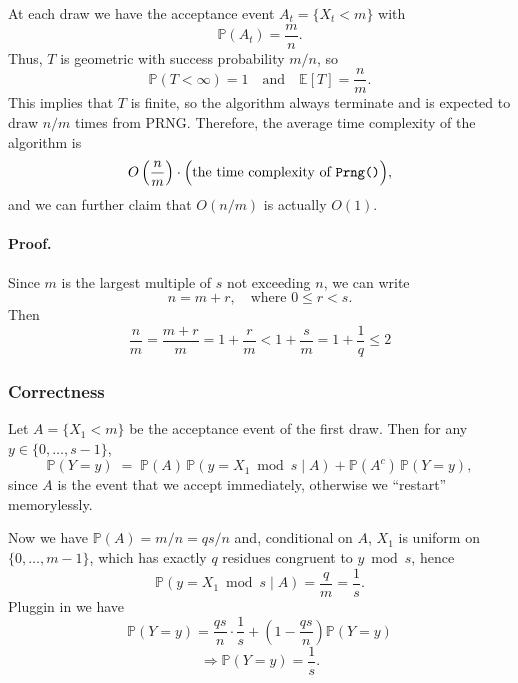 \documentclass[12pt]{article}
\begin{document}
At each draw we have the acceptance event \(A_t = \{X_t < m\}\) with
\[
    \mathbb{P}(A_t) = \frac{m}{n}.
\]
Thus, \(T\) is geometric with success probability \(m/n\), so
\[
    \mathbb{P}(T < \infty) = 1 \quad \text{and} \quad \mathbb{E}[T] = \frac{n}{m}.
\]
This implies that \(T\) is finite, so the algorithm always terminate and is expected to draw \(n/m\) times from PRNG. Therefore, the average time complexity of the algorithm is
\[
    O \left( \frac{n}{m} \right) \cdot \Bigl( \text{the time complexity of } \verb|Prng()| \Bigr),
\]
and we can further claim that \(O(n/m)\) is actually \(O(1)\).

\paragraph{Proof.} Since \(m\) is the largest multiple of \(s\) not exceeding \(n\), we can write
\[
    n = m + r, \quad \text{where } 0 \leq r < s.
\]
Then
\[
    \frac{n}{m} =
    \frac{m + r}{m} =
    1 + \frac{r}{m} <
    1 + \frac{s}{m} =
    1 + \frac{1}{q} \leq 2
\]

\subsubsection{Correctness}

Let \(A = \{X_1 < m\}\) be the acceptance event of the first draw. Then for any \(y \in \{0, \dots, s-1\}\),
\[
    \mathbb{P}(Y = y) \; = \; \mathbb{P}(A) \, \mathbb{P}(y = X_1 \bmod s \mid A) + \mathbb{P}(A^c) \, \mathbb{P}(Y = y),
\]
since \(A\) is the event that we accept immediately, otherwise we ``restart'' memorylessly.

Now we have \(\mathbb{P}(A) = m/n = qs / n\) and, conditional on \(A\), \(X_1\) is uniform on \(\{0, \dots, m-1\}\), which has exactly \(q\) residues congruent to \(y \bmod s\), hence
\[
    \mathbb{P}(y = X_1 \bmod s \mid A) = \frac{q}{m} = \frac{1}{s}.
\]
Pluggin in we have
\[
    \mathbb{P}(Y = y) = \frac{qs}{n} \cdot \frac{1}{s} + \left( 1 - \frac{qs}{n} \right) \mathbb{P}(Y = y)
\]
\[
    \Rightarrow \mathbb{P}(Y = y) = \frac{1}{s}.
\]
\end{document}
